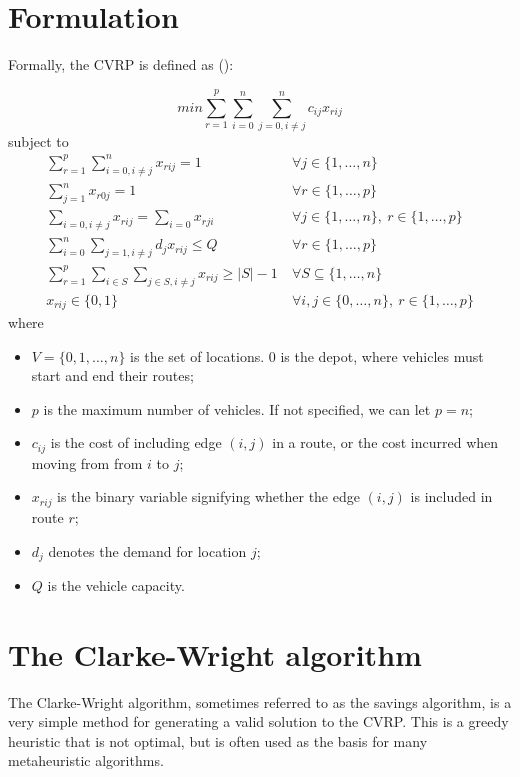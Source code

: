 \documentclass[12pt]{report}
\begin{document}
\section{Formulation}
Formally, the CVRP is defined as (\cite{borcinova2017two}):

\begin{equation}
    min \sum_{r=1}^p \sum_{i=0}^n \sum_{j=0, i \neq j}^n c_{ij}x_{rij} \label{eq:form1}
\end{equation}
subject to
\begin{align}
    \sum_{r=1}^p \sum_{i=0,i \neq j}^n x_{rij} = 1 \ & \forall j \in \{1, \dots, n\} \label{eq:form2} \\
    \sum_{j=1}^n x_{r0j} = 1 \ & \forall r \in \{1,\dots,p\} \label{eq:form3} \\
    \sum_{i=0,i \neq j} x_{rij} = \sum_{i=0} x_{rji} \ & \forall j \in \{1, \dots, n\},\ r \in \{1,\dots,p\} \label{eq:form4} \\
    \sum_{i=0}^n \sum_{j=1,i \neq j} d_j x_{rij} \leq Q \ & \forall r \in \{1,\dots,p\} \label{eq:form5} \\
    \sum_{r=1}^p \sum_{i \in S} \sum_{j \in S, i \neq j} x_{rij} \geq |S| - 1 \ & \forall S \subseteq \{1,\dots,n\} \label{eq:form6} \\
    x_{rij} \in \{ 0, 1 \} \ & \forall i,j \in \{0, \dots, n\},\ r \in \{1,\dots,p\} \label{eq:form7}
\end{align}
where
\begin{itemize}
	\item $V = \{0, 1, \dots, n\}$ is the set of locations. $0$ is the depot, where vehicles must start and end their routes;
	\item $p$ is the maximum number of vehicles. If not specified, we can let $p = n$;
	\item $c_{ij}$ is the cost of including edge $(i, j)$ in a route, or the cost incurred when moving from from $i$ to $j$;
	\item $x_{rij}$ is the binary variable signifying whether the edge $(i,j)$ is included in route $r$;
	\item $d_j$ denotes the demand for location $j$;
	\item $Q$ is the vehicle capacity.
\end{itemize}

\section{The Clarke-Wright algorithm}
The Clarke-Wright algorithm, sometimes referred to as the savings algorithm, is a very simple method for generating a valid solution to the CVRP. This is a greedy heuristic that is not optimal, but is often used as the basis for many metaheuristic algorithms.
\end{document}
